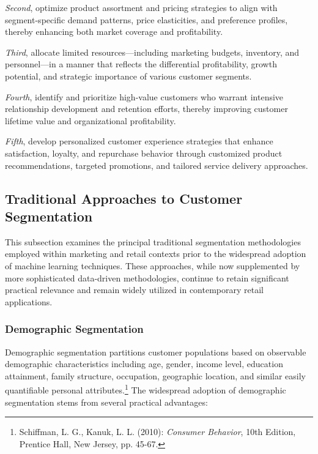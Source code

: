 \documentclass[12pt,a4paper,oneside]{report}
\begin{document}
\textit{Second}, optimize product assortment and pricing strategies to align with segment-specific demand patterns, price elasticities, and preference profiles, thereby enhancing both market coverage and profitability.

\textit{Third}, allocate limited resources—including marketing budgets, inventory, and personnel—in a manner that reflects the differential profitability, growth potential, and strategic importance of various customer segments.

\textit{Fourth}, identify and prioritize high-value customers who warrant intensive relationship development and retention efforts, thereby improving customer lifetime value and organizational profitability.

\textit{Fifth}, develop personalized customer experience strategies that enhance satisfaction, loyalty, and repurchase behavior through customized product recommendations, targeted promotions, and tailored service delivery approaches.


\subsection{Traditional Approaches to Customer Segmentation}

This subsection examines the principal traditional segmentation methodologies employed within marketing and retail contexts prior to the widespread adoption of machine learning techniques. These approaches, while now supplemented by more sophisticated data-driven methodologies, continue to retain significant practical relevance and remain widely utilized in contemporary retail applications.

\subsubsection{Demographic Segmentation}

Demographic segmentation partitions customer populations based on observable demographic characteristics including age, gender, income level, education attainment, family structure, occupation, geographic location, and similar easily quantifiable personal attributes.\footnote{Schiffman, L. G., Kanuk, L. L. (2010): \textit{Consumer Behavior}, 10th Edition, Prentice Hall, New Jersey, pp. 45-67.} The widespread adoption of demographic segmentation stems from several practical advantages:
\end{document}
